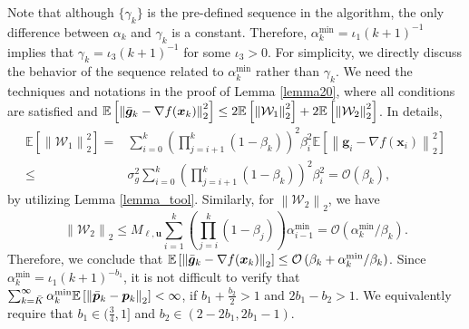 \documentclass[aos]{imsart}
\numberwithin{equation}{section}
\theoremstyle{plain}
\begin{document}
\begin{appendix}
    Note that although $\{\gamma_k\}$ is the pre-defined sequence in the algorithm, the only difference between $\alpha_k$ and $\gamma_k$ is a constant. Therefore, $\alpha_k^{\text{min}} = \iota_1 (k+1)^{-1}$ implies that $\gamma_k = \iota_3 (k+1)^{-1}$ for some $\iota_3>0$. For simplicity, we directly discuss the behavior of the sequence related to $\alpha_k^{\text{min}}$ rather than $\gamma_k$. We need the techniques and notations in the proof of Lemma \ref{lemma20}, where all conditions are satisfied and $\mathbb{E} \left[\left\| \Bar{\bm{g}}_{k} - \nabla f(\bm{x}_k) \right\|_2^2 \right] \leq 2\mathbb{E} \left[ \left\|\mathcal{W}_1\right\|_2^2 \right] + 2 \mathbb{E} \left[\left\|\mathcal{W}_2\right\|_2^2 \right]$.  In details,
    \begin{equation*}
        \begin{split}
            \mathbb{E}\left[ \left\|\mathcal{W}_1\right\|_2^2 \right] 
            = & \sum_{i=0}^{k} \left( \prod_{j=i+1}^{k} (1-\beta_k) \right)^2 \beta_i^2 \mathbb{E}\left[ \left\| \bm{g}_{i} - \nabla f(\bm{x}_{i}) \right\|_2^2 \right] \\
        \leq & \sigma_{g}^2 \sum_{i=0}^{k} \left( \prod_{j=i+1}^{k} (1-\beta_k) \right)^2 \beta_i^2 = \mathcal{O}\left(\beta_k \right),
        \end{split}
    \end{equation*}
    by utilizing Lemma \ref{lemma_tool}.
    Similarly, for $\left\|\mathcal{W}_2\right\|_2$, we have
    \begin{equation*}
            \left\|\mathcal{W}_2\right\|_2 
            \leq M_{\bm{\ell},\bm{u}}  \sum_{i=1}^{k} \left( \prod_{j=i}^{k} (1-\beta_j) \right) \alpha_{i-1}^{\text{min}} = \mathcal{O}\left(\alpha_k^{\text{min}} / \beta_k \right).
    \end{equation*}
    Therefore, we conclude that $\mathbb{E} \left[\left\| \Bar{\bm{g}}_{k} - \nabla f(\bm{x}_k) \right\|_2 \right] \leq  \mathcal{O}\left(\beta_k + \alpha_k^{\text{min}} / \beta_k \right)$. Since $\alpha_k^{\text{min}} = \iota_1 (k+1)^{-b_1}$, it is not difficult to verify that $\sum_{k=\Bar{K}}^{\infty} \alpha_k^{\text{min}} \mathbb{E} \left[\left\|\Bar{\bm{p}}_k - \bm{p}_k \right\|_2 \right] < \infty$, if $b_1 + \frac{b_2}{2} >1$ and $2b_1 - b_2 >1$. We equivalently require that $b_1 \in (\frac{3}{4},1]$ and $b_2 \in \left( 2-2b_1,2b_1-1\right)$.




\end{appendix}
\end{document}
